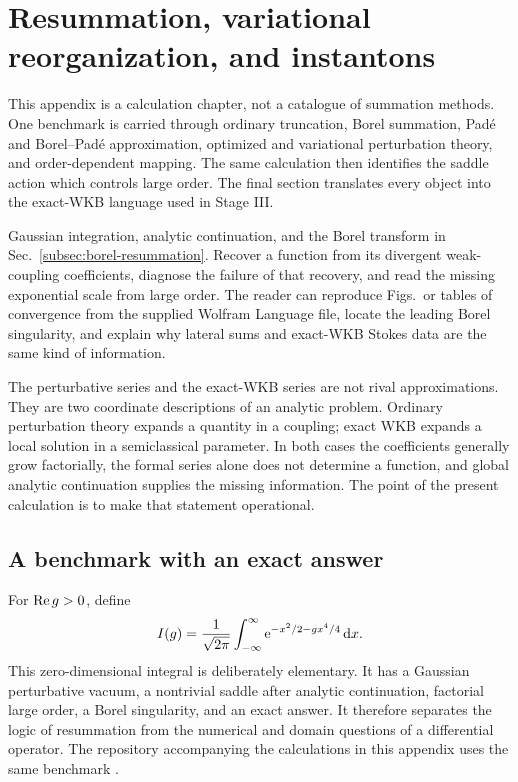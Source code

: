\chapter{Resummation, variational reorganization, and instantons}
\label{chap:resummation-instantons}

\begin{readercontract}
This appendix is a calculation chapter, not a catalogue of summation
methods.  One benchmark is carried through ordinary truncation, Borel
summation, Pad\'e and Borel--Pad\'e approximation, optimized and variational
perturbation theory, and order-dependent mapping.  The same calculation then
identifies the saddle action which controls large order.  The final section
translates every object into the exact-WKB language used in Stage III.
\end{readercontract}

\calculationroute
{Gaussian integration, analytic continuation, and the Borel transform in
Sec.~\ref{subsec:borel-resummation}.}
{Recover a function from its divergent weak-coupling coefficients, diagnose
the failure of that recovery, and read the missing exponential scale from
large order.}
{The reader can reproduce Figs.~or tables of convergence from the supplied
Wolfram Language file, locate the leading Borel singularity, and explain why
lateral sums and exact-WKB Stokes data are the same kind of information.}

The perturbative series and the exact-WKB series are not rival
approximations.  They are two coordinate descriptions of an analytic
problem.  Ordinary perturbation theory expands a quantity in a coupling;
exact WKB expands a local solution in a semiclassical parameter.  In both
cases the coefficients generally grow factorially, the formal series alone
does not determine a function, and global analytic continuation supplies the
missing information.  The point of the present calculation is to make that
statement operational.

\section{A benchmark with an exact answer}
\label{sec:quartic-zero-dimensional}

For $\operatorname{Re} g>0$, define
\begin{equation}
  I(g)=\frac{1}{\sqrt{2\pi}}
  \int_{-\infty}^{\infty}
  \mathrm{e}^{-x^2/2-gx^4/4}\,\mathrm{d} x .
  \label{eq:quartic-integral}
\end{equation}
This zero-dimensional integral is deliberately elementary.  It has a
Gaussian perturbative vacuum, a nontrivial saddle after analytic
continuation, factorial large order, a Borel singularity, and an exact answer.
It therefore separates the logic of resummation from the numerical and
domain questions of a differential operator.  The repository accompanying
the calculations in this appendix uses the same benchmark
\cite{Morikawa:ResummationRepository}.

